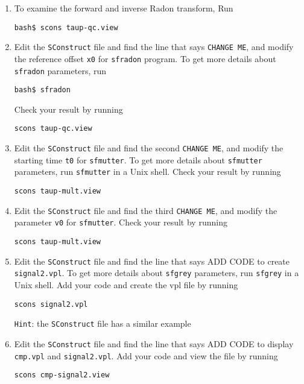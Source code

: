 \begin{enumerate}
\item To examine the forward and inverse Radon transform, Run
\begin{verbatim}
bash$ scons taup-qc.view
\end{verbatim}


\item Edit the \texttt{SConstruct} file and find the line that says \texttt{CHANGE ME}, and modify the reference offset \texttt{x0} for \texttt{sfradon} program. To get more details about \texttt{sfradon} parameters, run 
\begin{verbatim}
bash$ sfradon
\end{verbatim}
Check your result by running
\begin{verbatim}
scons taup-qc.view
\end{verbatim}

\item Edit the \texttt{SConstruct} file and find the second \texttt{CHANGE ME}, and modify the starting time \texttt{t0} for \texttt{sfmutter}. To get more details about \texttt{sfmutter} parameters, run \texttt{sfmutter} in a Unix shell. Check your result by running
\begin{verbatim}
scons taup-mult.view
\end{verbatim}

\item Edit the \texttt{SConstruct} file and find the third \texttt{CHANGE ME}, and modify the parameter \texttt{v0} for \texttt{sfmutter}. Check your result by running
\begin{verbatim}
scons taup-mult.view
\end{verbatim}

\item Edit the \texttt{SConstruct} file and find the line that says ADD CODE to create \texttt{signal2.vpl}. To get more details about \texttt{sfgrey} parameters, run \texttt{sfgrey} in a Unix shell. Add your code and create the vpl file by running
\begin{verbatim}
scons signal2.vpl
\end{verbatim}
\texttt{Hint}: the \texttt{SConstruct} file has a similar example

\item Edit the \texttt{SConstruct} file and find the line that says ADD CODE to display \texttt{cmp.vpl} and \texttt{signal2.vpl}. Add your code and view the file by running
\begin{verbatim}
scons cmp-signal2.view
\end{verbatim}


\end{enumerate}
